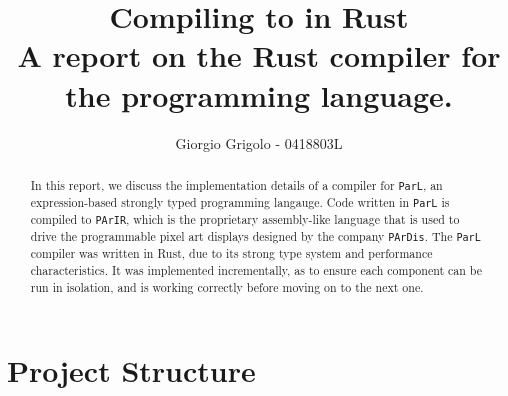 \documentclass{article}
\title{Compiling \code{ParL} to \code{PArIR} in Rust \\{\normalsize A report on the Rust
compiler for the \code{ParL} programming language.}}
\author{Giorgio Grigolo - 0418803L}
\date{}
\newcommand{\code}[1]{\texttt{#1}}
\begin{document}
\maketitle
\tableofcontents

\begin{abstract}
    In this report, we discuss the implementation details of a
    compiler for \code{ParL}, an expression-based strongly typed programming
    langauge. Code written in \code{ParL} is compiled to \code{PArIR}, which is
    the proprietary assembly-like language that is used to drive the
    programmable pixel art displays designed by the company \code{PArDis}. The
    \code{ParL} compiler was written in Rust, due to its strong type system and
    performance characteristics. It was implemented incrementally, as
    to ensure each component can be run in isolation, and is working correctly
    before moving on to the next one.
\end{abstract}

\newpage

\section{Project Structure}

\newpage






\newpage



\newpage

\printbibliography
\end{document}

